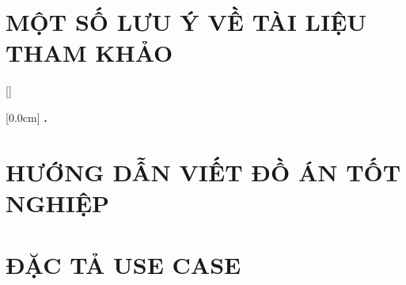 \documentclass[a4paper,13pt,3p,twoside]{report}
\renewcommand{\bibname}{Danh_sach_tai_lieu_tham_khao}
\theoremstyle{definition}
\begin{document}
\newpage
\chapter*{MỘT SỐ LƯU Ý VỀ TÀI LIỆU THAM KHẢO} %
\label{chapter:reference}



\newpage
\renewcommand\bibname{TÀI LIỆU THAM KHẢO}
\printbibliography
{}

\appendixpage
\appendices
\addappheadtotoc


{}[]
\titlespacing*{\chapter}{0pt}{-20pt}{20pt}

    [0.0cm]             %
    {\bfseries\vspace{0.3cm}}                  %
    {{\bfseries{\scshape} \thecontentslabel.\ }} %
    {}         %
    {\contentspage}         %
\chapter{HƯỚNG DẪN VIẾT ĐỒ ÁN TỐT NGHIỆP}

\newpage
\chapter{ĐẶC TẢ USE CASE}

\end{document}
